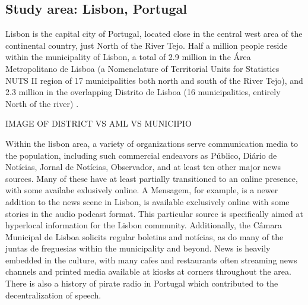 \subsection{Study area: Lisbon, Portugal}
Lisbon is the capital city of Portugal, located close in the central west area of the continental country, just North of the River Tejo. Half a million people reside within the municipality of Lisbon, a total of 2.9 million in the Área Metropolitano de Lisboa (a Nomenclature of Territorial Units for Statistics NUTS II region \cite{eurostat} of 17 municipalities both north and south of the River Tejo), and 2.3 million in the overlapping Distrito de Lisboa (16 municipalities, entirely North of the river) \cite{censos2021}.

{\color{red}IMAGE OF DISTRICT VS AML VS MUNICIPIO}

Within the lisbon area, a variety of organizations serve communication media to the population, including such commercial endeavors as Público, Diário de Notícias, Jornal de Notícias, Observador, and at least ten other major news sources. Many of these have at least partially transitioned to an online presence, with some availabe exlusively online. A Mensagem, for example, is a newer addition to the news scene in Lisbon, is available exclusively online with some stories in the audio podcast format. This particular source is specifically aimed at hyperlocal information for the Lisbon community. Additionally, the Câmara Municipal de Lisboa solicits regular boletins and notícias, as do many of the juntas de freguesias within the municipality and beyond. News is heavily embedded in the culture, with many cafes and restaurants often streaming news channels and printed media available at kiosks at corners throughout the area. There is also a history of pirate radio in Portugal which contributed to the decentralization of speech\cite{Bonixe2019}. %
